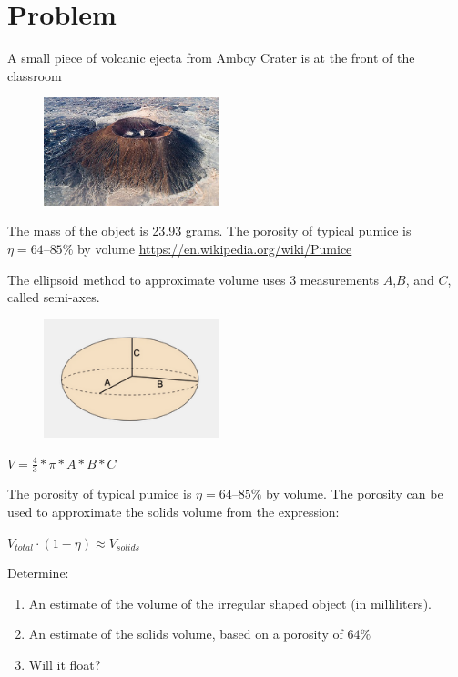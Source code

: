 \documentclass[12pt]{article}
\begin{document}
\section*{ }
\section*{Problem}
A small piece of volcanic ejecta from Amboy Crater is at the front of
the classroom

\begin{figure}[htbp] %
   \centering
\includegraphics[width=2in]{amboy.png}
\end{figure}

The mass of the object is 23.93 grams. The porosity of typical pumice is
\(\eta = 64–85\%\) by volume
\url{https://en.wikipedia.org/wiki/Pumice}

The ellipsoid method to approximate volume uses 3 measurements
\(A\),\(B\), and \(C\), called semi-axes.

\begin{figure}[htbp] %
\centering
\includegraphics[width=2in]{ellipsoid.png}
\end{figure}

\(V = \frac{4}{3} * \pi * A * B * C\)

The porosity of typical pumice is \(\eta = 64–85\%\) by volume. The porosity can
be used to approximate the solids volume from the expression:

\(V_{total} \cdot (1-\eta) \approx V_{solids}\)

Determine: 
\begin{enumerate}
\item An estimate of the volume of the irregular shaped object (in milliliters). 
\item An estimate of the solids volume, based on a porosity of \(64\%\) 
\item Will it float?

\end{enumerate}


    
    
    
\end{document}
